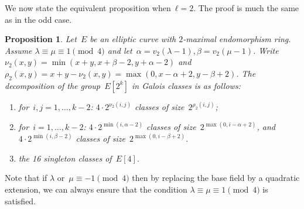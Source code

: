 \documentclass{lms}
\newtheorem{prop}[thm]{Proposition}
\def\mat#1{\begin{pmatrix}#1\end{pmatrix}}
\def\smat#1{{\def\arraystretch{.7}\mat{#1}}}
\def\acco#1{\left\{#1\right\}}
\begin{document}
We now state the equivalent proposition when~$ℓ = 2$.
The proof is much the same as in the odd case.

\begin{prop}\label{prop:orbites-2-torsion}
Let~$E$ be an elliptic curve with $2$-maximal endomorphism ring.
Assume $λ ≡ μ ≡ 1 \pmod{4}$ and let~$α = v_2(λ-1), β=v_2(μ-1)$.
Write~$ν_2(x, y) = \min (x+y, x+β-2, y+α-2)$
and~$ρ_2(x, y) = x+y - ν_2(x, y) = \max (0, x-α+2, y-β+2)$.
The decomposition of the group~$E[2^k]$ in Galois classes is as follows:
\begin{enumerate}
\item for~$i, j = 1, …, k-2$:
$4 · 2^{ν_2(i,j)}$ classes of size~$2^{ρ_2(i,j)}$;
\item for~$i = 1, …, k-2$:
$4 · 2^{\min (i, α-2)}$ classes of size~$2^{\max (0, i-α+2)}$, and
$4 · 2^{\min (i, β-2)}$ classes of size~$2^{\max (0, i-β+2)}$.
\item the 16 singleton classes of~$E[4]$.
\end{enumerate}
\end{prop}
Note that if $λ$ or~$μ ≡ -1 \pmod{4}$ then
by replacing the base field by a quadratic extension,
we can always ensure that the condition $λ ≡ μ ≡ 1 \pmod{4}$ is
satisfied.
% 
% 
\end{document}
